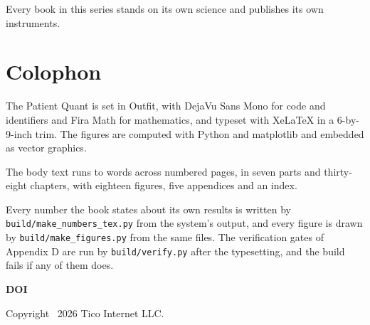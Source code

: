 \begin{keytakeaways}
\item Every book in this series stands on its own science and publishes
its own instruments.
\end{keytakeaways}
\clearpage

\chapter*{Colophon}
\thispagestyle{plain}

\noindent\small
\setmainfont{Outfit}
\noindent The Patient Quant is set in Outfit, with DejaVu Sans Mono for
code and identifiers and Fira Math for mathematics, and typeset with
XeLaTeX in a 6-by-9-inch trim. The figures are computed with Python and
matplotlib and embedded as vector graphics.

\noindent The body text runs to \bookWords{} words across \bookPages{}
numbered pages, in seven parts and thirty-eight chapters, with eighteen
figures, five appendices and an index.

\noindent Every number the book states about its own results is written by
\texttt{build/make\_numbers\_tex.py} from the system's output, and every
figure is drawn by \texttt{build/make\_figures.py} from the same files.
The verification gates of Appendix D are run by \texttt{build/verify.py}
after the typesetting, and the build fails if any of them does.

\vspace{8pt}
\noindent\textbf{DOI}\quad \href{https://doi.org/\bookDOI}{\texttt{\bookDOI}}\par

\vspace{8pt}
\noindent Copyright \textcopyright\ 2026 Tico Internet LLC.
\clearpage
